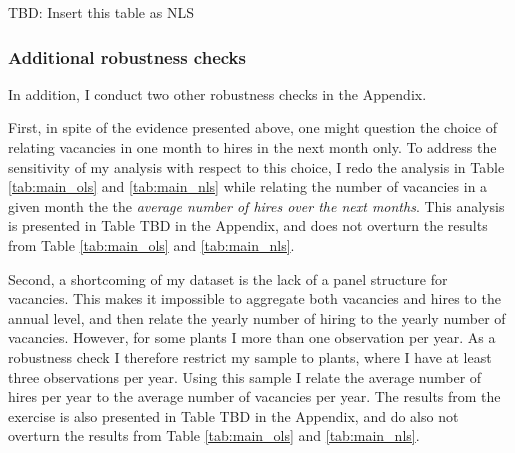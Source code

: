 
TBD: Insert this table as NLS

\subsubsection{Additional robustness checks}

In addition, I conduct two other robustness checks in the Appendix. 

First, in spite of the evidence presented above, one might question the choice of relating vacancies in one month to hires in the next month only. To address the sensitivity of my analysis with respect to this choice, I redo the analysis in Table \ref{tab:main_ols} and \ref{tab:main_nls} while relating the number of vacancies in a given month the the \emph{average number of hires over the next months}. This analysis is presented in Table TBD in the Appendix, and does not overturn the results from Table \ref{tab:main_ols} and \ref{tab:main_nls}.

Second, a shortcoming of my dataset is the lack of a panel structure for vacancies. This makes it impossible to aggregate both vacancies and hires to the annual level, and then relate the yearly number of hiring to the yearly number of vacancies. However, for some plants I more than one observation per year. As a robustness check I therefore restrict my sample to plants, where I have at least three observations per year. Using this sample I relate the average number of hires per year to the average number of vacancies per year.  The results from the exercise is also presented in Table TBD in the Appendix, and do also not overturn the results from Table \ref{tab:main_ols} and \ref{tab:main_nls}.